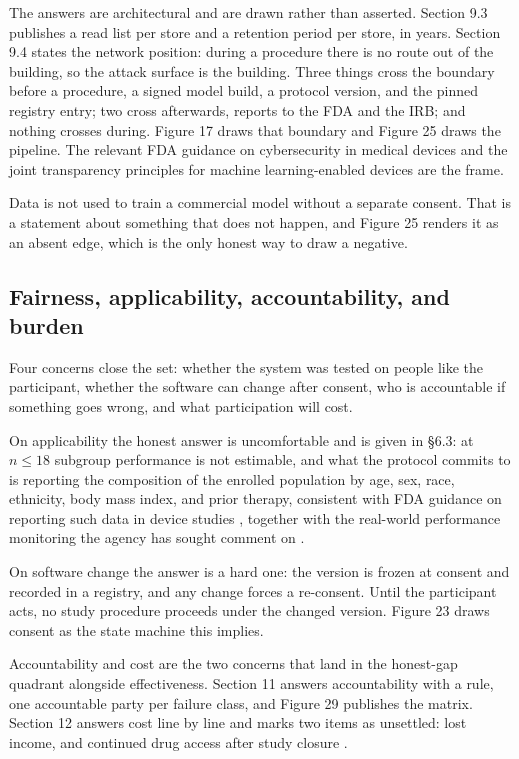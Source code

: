 The answers are architectural and are drawn rather than asserted. Section 9.3
publishes a read list per store and a retention period per store, in years.
Section 9.4 states the network position: during a procedure there is no route
out of the building, so the attack surface is the building. Three things cross
the boundary before a procedure, a signed model build, a protocol version, and
the pinned registry entry; two cross afterwards, reports to the FDA and the IRB;
and nothing crosses during. Figure 17 draws that boundary and Figure 25 draws
the pipeline. The relevant FDA guidance on cybersecurity in medical devices
\cite{FDACyber2026} and the joint transparency principles for machine
learning-enabled devices \cite{FDATrans2024} are the frame.

Data is not used to train a commercial model without a separate consent. That is
a statement about something that does not happen, and Figure 25 renders it as an
absent edge, which is the only honest way to draw a negative.

\subsection{Fairness, applicability, accountability, and burden}

Four concerns close the set: whether the system was tested on people like the
participant, whether the software can change after consent, who is accountable
if something goes wrong, and what participation will cost.

On applicability the honest answer is uncomfortable and is given in \S6.3: at
$n \leq 18$ subgroup performance is not estimable, and what the protocol commits
to is reporting the composition of the enrolled population by age, sex, race,
ethnicity, body mass index, and prior therapy, consistent with FDA guidance on
reporting such data in device studies \cite{FDADiver2017}, together with the
real-world performance monitoring the agency has sought comment on
\cite{FDARealW2025}.

On software change the answer is a hard one: the version is frozen at consent
and recorded in a registry, and any change forces a re-consent. Until the
participant acts, no study procedure proceeds under the changed version.
Figure 23 draws consent as the state machine this implies.

Accountability and cost are the two concerns that land in the honest-gap
quadrant alongside effectiveness. Section 11 answers accountability with a rule,
one accountable party per failure class, and Figure 29 publishes the matrix.
Section 12 answers cost line by line and marks two items as unsettled: lost
income, and continued drug access after study closure \cite{NCICosts2024}.

